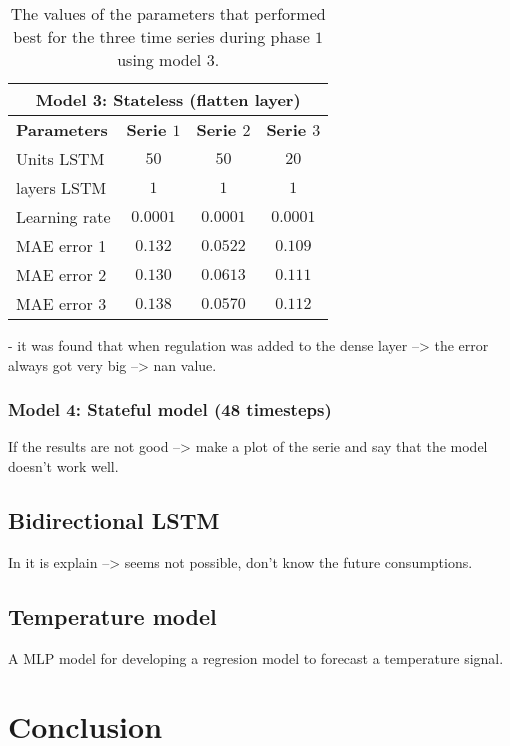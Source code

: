 \begin{table}[ht]
	\centering
	\begin{tabular}{@{}l|ccc@{}} \toprule
		\multicolumn{4}{c}{Model 3: Stateless (flatten layer)}\\\midrule\midrule
		\textbf{Parameters}	& \textbf{Serie $ 1 $} & \textbf{Serie $ 2 $} & \textbf{Serie $ 3 $}\\\midrule
		Units LSTM & $50 $&$ 50 $  & $20 $\\
		layers LSTM & $1 $&$ 1 $  & $1$\\
		Learning rate & $0.0001 $&$ 0.0001$  & $0.0001$\\\hline
		MAE error 1   & $ 0.132 $ & $ 0.0522 $ & $ 0.109 $\\
		MAE error 2   & $ 0.130 $ & $ 0.0613 $ & $ 0.111 $\\
		MAE error 3   & $ 0.138 $ & $ 0.0570 $ & $ 0.112 $\\\bottomrule
	\end{tabular}
	\caption{The values of the parameters that performed best for the three time series during phase $ 1 $ using model $3 $.}
	\label{tab:best_performing_para_phase1_model3}
\end{table}

- it was found that when regulation was added to the dense layer --> the error always got very big --> nan value. 


\subsubsection{Model 4: Stateful model (48 timesteps)}
If the results are not good --> make a plot of the serie and say that the model doesn't work well. 







\subsection{Bidirectional LSTM}
In \cite{Teuwen2019} it is explain --> seems not possible, don't know the future consumptions.


\subsection{Temperature model}
A MLP model for developing a regresion model to forecast a temperature signal. 




\section{Conclusion}


